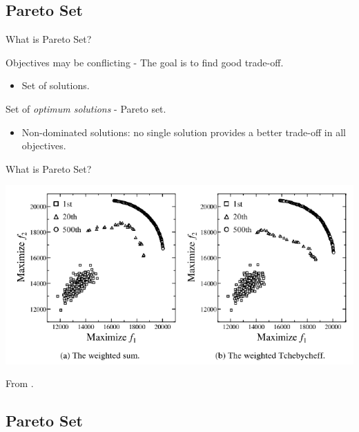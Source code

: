 \documentclass[ignorenonframetext,]{beamer}
\providecommand{\tightlist}{%
  \setlength{\itemsep}{0pt}\setlength{\parskip}{0pt}}
\begin{document}
\subsection{Pareto Set}\label{pareto-set}

\begin{frame}{What is Pareto Set?}

Objectives may be conflicting - The goal is to find good trade-off.

\begin{itemize}
\tightlist
\item
  Set of solutions.
\end{itemize}

Set of \emph{optimum solutions} - Pareto set.

\begin{itemize}
\tightlist
\item
  Non-dominated solutions: no single solution provides a better
  trade-off in all objectives.
\end{itemize}

\end{frame}

\begin{frame}{What is Pareto Set?}

\centering
\includegraphics{cellular_moead_files/figure-beamer/unnamed-chunk-1-1.pdf}

\tiny From \citet{ishibuchi2009adaptation}.

\end{frame}

\subsection{Pareto Set}\label{pareto-set-1}
\end{document}
